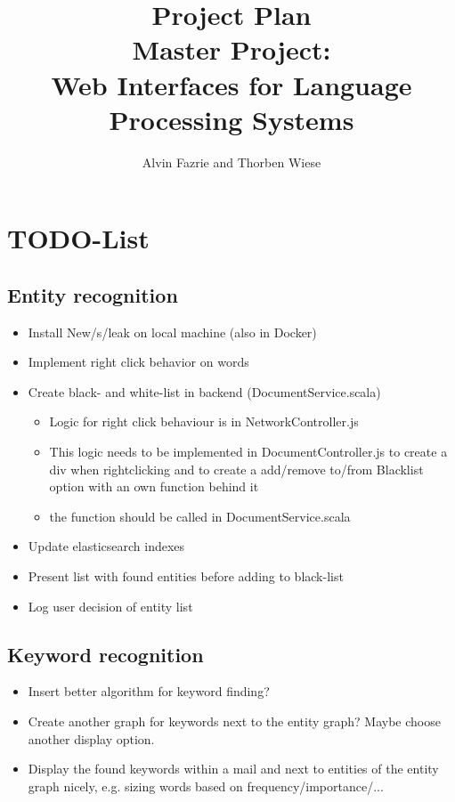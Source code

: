 \documentclass[a4paper]{article}
\title{Project Plan\\[0.5cm]
Master Project:\\Web Interfaces for Language Processing Systems
}
\author{Alvin Fazrie and Thorben Wiese}
\begin{document}
\maketitle

\section{TODO-List}
\subsection{Entity recognition}

\begin{itemize}
\item Install New/s/leak on local machine (also in Docker)
\item Implement right click behavior on words
\item Create black- and white-list in backend (DocumentService.scala)
\begin{itemize}
	\item Logic for right click behaviour is in NetworkController.js
	\item This logic needs to be implemented in DocumentController.js to create a div when rightclicking and to create a add/remove to/from Blacklist option with an own function behind it
	\item the function should be called in DocumentService.scala
\end{itemize}
\item Update elasticsearch indexes
\item Present list with found entities before adding to black-list
\item Log user decision of entity list
\end{itemize}

\subsection{Keyword recognition}

\begin{itemize}
\item Insert better algorithm for keyword finding?
\item Create another graph for keywords next to the entity graph? Maybe choose another display option.
\item Display the found keywords within a mail and next to entities of the entity graph nicely, e.g. sizing words based on frequency/importance/...
\end{itemize}
\end{document}
